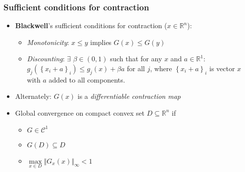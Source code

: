 \documentclass[bigger]{beamer}
\begin{document}
\begin{frame}%
\frametitle{Sufficient conditions for contraction}

\begin{itemize}

\item \textbf{Blackwell}'s sufficient conditions for contraction ($x\in 
\mathbb{R}^{n}$):

\begin{itemize}
\item \emph{Monotonicity}: $x\leq y$ implies $G(x)\leq G(y)$

\item \emph{Discounting}: $\exists $ $\beta \in (0,1)$ such that for any $x$
and $a\in \mathbb{R}^{1}$:\newline
$g_{j}(\left\{ x_{i}+a\right\} _{i})\leq g_{j}(x)+\beta a$ for all $j$, 
\newline
where $\left\{ x_{i}+a\right\} _{i}$ is vector $x$ with $a$ added to all
components.
\end{itemize}

\item Alternately: $G(x)$ is a \emph{differentiable contraction map} 
\item Global convergence on compact convex set $D\subseteq\mathbb{R}^n$ if 
\begin{itemize}
\item $G\in\mathcal{C}^1$ 
\item $G(D)\subseteq D$
\item $\underset{x\in D}{\max}\left\Vert G_x(x)\right\Vert_{\infty}<1$
\end{itemize}

\end{itemize}


\end{frame}%
\end{document}
